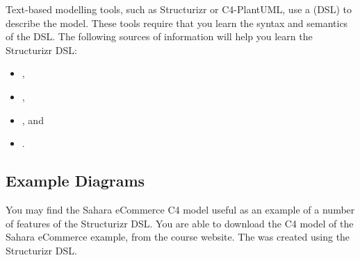 Text-based modelling tools, such as Structurizr or C4-PlantUML, use a
 (DSL) to describe the model.
These tools require that you learn the syntax and semantics of the DSL.
The following sources of information will help you learn the Structurizr DSL:
\begin{itemize}[nosep]
    \item {},
    \item {}, 
    \item {}, and
    \item {}.
\end{itemize}

\subsection{Example Diagrams}
You may find the Sahara eCommerce C4 model useful as an example of a number of features of the Structurizr DSL.
You are able to download the C4 model of the Sahara eCommerce example, from the course website.
The 
was created using the Structurizr DSL.
